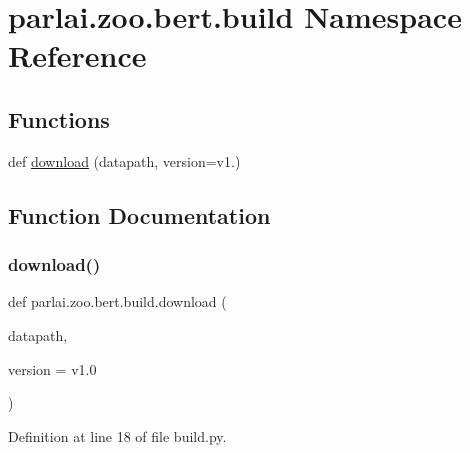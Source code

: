 \hypertarget{namespaceparlai_1_1zoo_1_1bert_1_1build}{}\section{parlai.\+zoo.\+bert.\+build Namespace Reference}
\label{namespaceparlai_1_1zoo_1_1bert_1_1build}
\subsection*{Functions}
\begin{DoxyCompactItemize}
\item 
def \hyperlink{namespaceparlai_1_1zoo_1_1bert_1_1build_a40206dbfe08db448469e0524dd093200}{download} (datapath, version=\textquotesingle{}v1.\textquotesingle{})
\end{DoxyCompactItemize}


\subsection{Function Documentation}
\mbox{\label{namespaceparlai_1_1zoo_1_1bert_1_1build_a40206dbfe08db448469e0524dd093200}} 
\subsubsection{\texorpdfstring{download()}{download()}}
{\footnotesize\ttfamily def parlai.\+zoo.\+bert.\+build.\+download (\begin{DoxyParamCaption}\item[{}]{datapath,  }\item[{}]{version = {\ttfamily \textquotesingle{}v1.0\textquotesingle{}} }\end{DoxyParamCaption})}



Definition at line 18 of file build.\+py.

